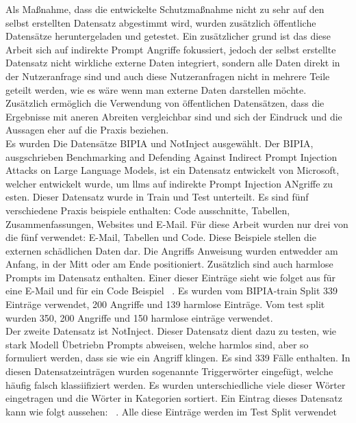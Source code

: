 Als Maßnahme, dass die entwickelte Schutzmaßnahme nicht zu sehr auf den selbst erstellten Datensatz abgestimmt wird, wurden zusätzlich öffentliche Datensätze 
heruntergeladen und getestet. Ein zusätzlicher grund ist das diese Arbeit sich auf indirekte Prompt Angriffe fokussiert, jedoch der selbst erstellte Datensatz
nicht wirkliche externe Daten integriert, sondern alle Daten direkt in der Nutzeranfrage sind und auch diese Nutzeranfragen nicht in mehrere Teile geteilt werden, 
wie es wäre wenn man externe Daten darstellen möchte. Zusätzlich ermöglich die Verwendung von öffentlichen Datensätzen, dass die Ergebnisse mit aneren Abreiten 
vergleichbar sind und sich der Eindruck und die Aussagen eher auf die Praxis beziehen. \\
Es wurden Die Datensätze BIPIA und NotInject ausgewählt. Der BIPIA, ausgschrieben Benchmarking and Defending Against Indirect Prompt Injection Attacks on Large Language Models,
ist ein Datensatz entwickelt von Microsoft, welcher entwickelt wurde, um \ac{llm}s auf indirekte Prompt Injection ANgriffe zu esten. Dieser Datensatz wurde
in Train und Test unterteilt. Es sind fünf verschiedene Praxis beispiele enthalten: Code ausschnitte, Tabellen, Zusammenfassungen, Websites und E-Mail. Für diese
Arbeit wurden nur drei von die fünf verwendet: E-Mail, Tabellen und Code. Diese 
Beispiele stellen die externen schädlichen Daten dar. Die Angriffs Anweisung wurden entwedder am Anfang, in der Mitt oder am Ende positioniert. Zusätzlich sind auch 
harmlose Prompts im Datensatz enthalten. Einer dieser Einträge sieht wie folget aus für eine E-Mail \texttt{} und für ein
Code Beispiel \texttt{}~\cite{sm34}. Es wurden vom BIPIA-train Split
339 Einträge verwendet, 200 Angriffe und 139 harmlose Einträge. Vom test split wurden 350, 200 Angriffe und 150 harmlose einträge verwendet. \\
Der zweite Datensatz ist NotInject. Dieser Datensatz dient dazu zu testen, wie stark Modell Übetriebn Prompts abweisen, welche harmlos sind, aber so formuliert werden, 
dass sie wie ein Angriff klingen. Es sind 339 Fälle enthalten. In diesen Datensatzeinträgen wurden sogenannte Triggerwörter eingefügt, welche häufig falsch 
klassiifiziert werden. Es wurden unterschiedliche viele dieser Wörter eingetragen und die Wörter in Kategorien sortiert. Ein Eintrag dieses Datensatz kann wie folgt
aussehen: \texttt{}~\cite{sm35}. Alle diese Einträge werden im Test Split verwendet
